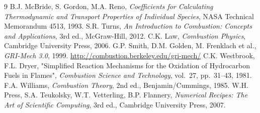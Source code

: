 \documentclass[11pt,a4paper]{article}
\begin{document}
\begin{thebibliography}{9}
 B.J. McBride, S. Gordon, M.A. Reno,
  \emph{Coefficients for Calculating Thermodynamic and Transport Properties of
  Individual Species}, NASA Technical Memorandum 4513, 1993.
 S.R. Turns, \emph{An Introduction to Combustion: Concepts and
  Applications}, 3rd ed., McGraw-Hill, 2012.
 C.K. Law, \emph{Combustion Physics}, Cambridge University Press,
  2006.
 G.P. Smith, D.M. Golden, M. Frenklach et al.,
  \emph{GRI-Mech 3.0}, 1999. \url{http://combustion.berkeley.edu/gri-mech/}
 C.K. Westbrook, F.L. Dryer, "Simplified Reaction Mechanisms
  for the Oxidation of Hydrocarbon Fuels in Flames", \emph{Combustion Science
  and Technology}, vol.~27, pp.~31--43, 1981.
 F.A. Williams, \emph{Combustion Theory}, 2nd ed.,
  Benjamin/Cummings, 1985.
 W.H. Press, S.A. Teukolsky, W.T. Vetterling, B.P. Flannery,
  \emph{Numerical Recipes: The Art of Scientific Computing}, 3rd ed., Cambridge
  University Press, 2007.
\end{thebibliography}
\end{document}
